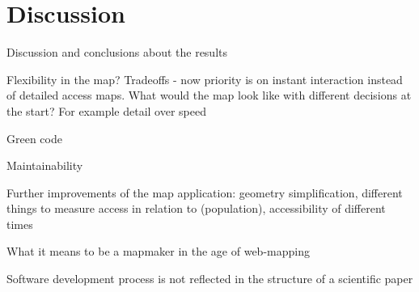 \section{Discussion}

Discussion and conclusions about the results

Flexibility in the map? Tradeoffs - now priority is on instant interaction instead of detailed access maps.
What would the map look like with different decisions at the start? For example detail over speed

Green code

Maintainability

Further improvements of the map application:
geometry simplification,
different things to measure access in relation to (population),
accessibility of different times

What it means to be a mapmaker in the age of web-mapping

Software development process is not reflected in the structure of a scientific paper
